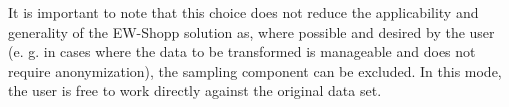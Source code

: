 It is important to note that this choice does not reduce the applicability and generality of the EW-Shopp solution as, where possible and desired by the user (e. g. in cases where the data to be transformed is manageable and does not require anonymization), the sampling component can be excluded. In this mode, the user is free to work directly against the original data set. 